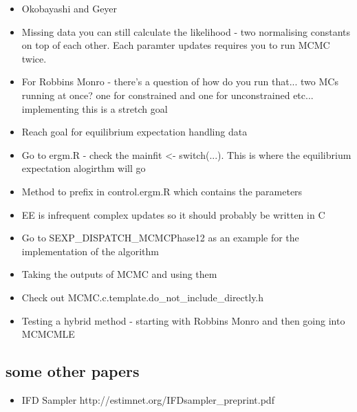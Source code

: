\begin{itemize}
\begin{itemize}
        \item Okobayashi and Geyer
        \item Missing data you can still calculate the likelihood - two normalising constants on top of each other. Each paramter updates requires you to run MCMC twice. 
        \item For Robbins Monro - there's a question of how do you run that... two MCs running at once? one for constrained and one for unconstrained etc... implementing this is a stretch goal
        \item Reach goal for equilibrium expectation handling data
        \item Go to ergm.R - check the mainfit <- switch(...). This is where the equilibrium expectation alogirthm will go
        \item Method to prefix in control.ergm.R which contains the parameters 
        \item EE is infrequent complex updates so it should probably be written in C
        \item Go to SEXP\_DISPATCH\_MCMCPhase12 as an example for the implementation of the algorithm
        \item Taking the outputs of MCMC and using them 
        \item Check out MCMC.c.template.do\_not\_include\_directly.h
        \item Testing a hybrid method - starting with Robbins Monro and then going into MCMCMLE
    \end{itemize}
\end{itemize}

\subsection{some other papers}

\begin{itemize}
\item IFD Sampler http://estimnet.org/IFDsampler_preprint.pdf
\end{itemize}